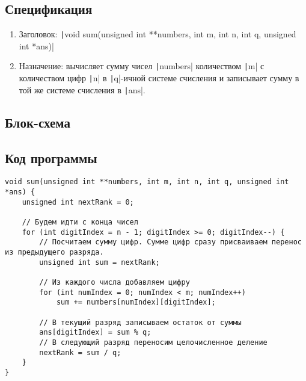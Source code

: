 \documentclass[a4paper, 12pt, oneside]{article}
\newcommand\makenewfig[3] {
    \captionsetup{format=imagecaption}
    \begin{center}
        #1
        \nopagebreak
        \captionof{figure}{#2}
        \nopagebreak
        \label{#3}
    \end{center}
}
\begin{document}
    \subsection{Спецификация}

    \begin{enumerate}
        \item Заголовок:  \texttt|void sum(unsigned int **numbers, int m, int n, int q, unsigned int *ans)|
        \item Назначение: вычисляет сумму чисел \texttt|numbers| количеством \texttt|m| с количеством цифр \texttt|n|
        в \texttt|q|-ичной системе счисления и записывает сумму в той же системе счисления в \texttt|ans|.
    \end{enumerate}

    \subsection{Блок-схема}
    \makenewfig{}{Функция sum}{ris:task7}

    \subsection{Код программы}
    \begin{verbatim}
void sum(unsigned int **numbers, int m, int n, int q, unsigned int *ans) {
    unsigned int nextRank = 0;

    // Будем идти с конца чисел
    for (int digitIndex = n - 1; digitIndex >= 0; digitIndex--) {
        // Посчитаем сумму цифр. Сумме цифр сразу присваиваем перенос из предыдущего разряда.
        unsigned int sum = nextRank;

        // Из каждого числа добавляем цифру
        for (int numIndex = 0; numIndex < m; numIndex++)
            sum += numbers[numIndex][digitIndex];

        // В текущий разряд записываем остаток от суммы
        ans[digitIndex] = sum % q;
        // В следующий разряд переносим целочисленное деление
        nextRank = sum / q;
    }
}
    \end{verbatim}
\end{document}
